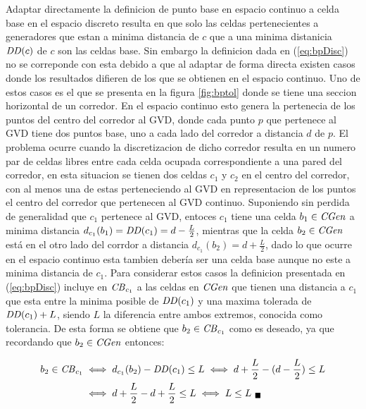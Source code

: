 Adaptar directamente la definicion de punto base en espacio continuo a celda
base en el espacio discreto resulta en que solo las celdas pertenecientes a
generadores que estan a minima distancia de $c$ que a una minima distanicia
$\mathit{DD}(c)$ de $c$ son las celdas base. Sin embargo la definicion dada en
(\ref{eq:bpDisc}) no se correponde con esta debido a que al adaptar de forma
directa existen casos donde los resultados difieren de los que se obtienen en
el espacio continuo. 
Uno de estos casos es el que se presenta en la figura \ref{fig:bptol} donde se
tiene una seccion horizontal de un corredor. En el espacio continuo esto genera
la pertenecia de los puntos del centro del corredor al GVD, donde cada punto
$p$ que pertenece al GVD tiene dos puntos base, uno a cada lado del corredor a
distancia $d$ de $p$. 
El problema ocurre cuando la discretizacion de dicho corredor resulta en un
numero par de celdas libres entre cada celda ocupada correspondiente a una
pared del corredor, en esta situacion se tienen dos celdas $c_1$ y $c_2$ en el
centro del corredor, con al menos una de estas perteneciendo al GVD en
representacion de los puntos el centro del corredor que pertenecen al GVD continuo.
Suponiendo sin perdida de generalidad que $c_1$ pertenece al GVD, entoces $c_1$
tiene una celda $b_1 \in \mathit{CGen}$ a minima distancia $d_{c_1}(b_1) = \mathit{DD}(c_1) =
d-\frac{L}{2}$, mientras que la celda $b_2 \in \mathit{CGen}$ está en el otro lado del
corrdor a distancia $d_{c_1}(b_2) = d+\frac{L}{2}$, dado lo que ocurre en el
espacio continuo esta tambien debería ser una celda base aunque no este a
minima distancia de $c_1$. Para considerar estos casos la definicion presentada
en (\ref{eq:bpDisc}) incluye en $\mathit{CB}_{c_1}$ a las celdas en $\mathit{CGen}$ que
tienen una distancia a $c_1$ que esta entre la minima posible de $\mathit{DD}(c_1)$ y
una maxima tolerada de $\mathit{DD}(c_1)+L$, siendo $L$ la diferencia entre ambos
extremos, conocida como tolerancia. De esta forma se obtiene que $b_2 \in
\mathit{CB}_{c_1}$ como es deseado, ya que recordando que $b_2\in \mathit{CGen}$ entonces:

\begin{align*}
\begin{split}
  b_2 \in \mathit{CB}_{c_1} & \iff  d_{c_1}(b_2) - \mathit{DD}(c_1) \leq L \iff d+\frac{L}{2} - (d-\frac{L}{2}) \leq L\\
                          & \iff   d+\frac{L}{2} -d +\frac{L}{2} \leq L \iff L \leq L_{\ \blacksquare}
\end{split}
\end{align*}

